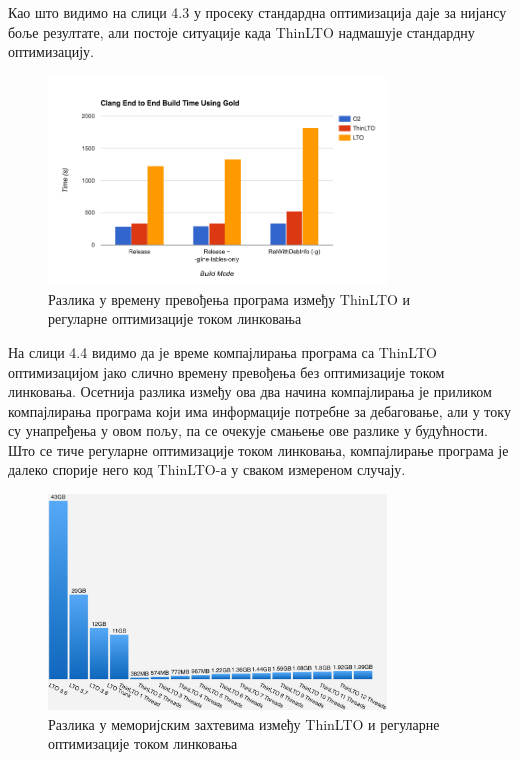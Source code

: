 \documentclass[12pt,oneside]{memoir}
\begin{document}
Као што видимо на слици 4.3 у просеку стандардна оптимизација даје за нијансу
боље резултате, али постоје ситуације када ThinLTO надмашује стандардну оптимизацију.


\begin{figure}[!ht]
  \centering
  \includegraphics[width=0.8\textwidth]{build_time.png}
  \caption{Разлика у времену превођења програма
   између ThinLTO и регуларне оптимизације током линковања }
  \label{fig:grafikon}
\end{figure}

На слици 4.4 видимо да је време компајлирања програма са ThinLTO оптимизацијом
јако слично времену превођења без оптимизације током линковања.
Осетнија разлика између ова два начина компајлирања је приликом компајлирања
програма који има информације потребне за дебаговање, али у току су унапређења
у овом пољу, па се очекује смањење ове разлике у будућности.
Што се тиче регуларне оптимизације током линковања, компајлирање програма
је далеко спорије него код ThinLTO-а у сваком измереном случају.
 
\begin{figure}[!ht]
  \centering
  \includegraphics[width=0.8\textwidth]{memory.png}
  \caption{Разлика у меморијским захтевима
   између ThinLTO и регуларне оптимизације током линковања }
  \label{fig:grafikon}
\end{figure}
\end{document}
